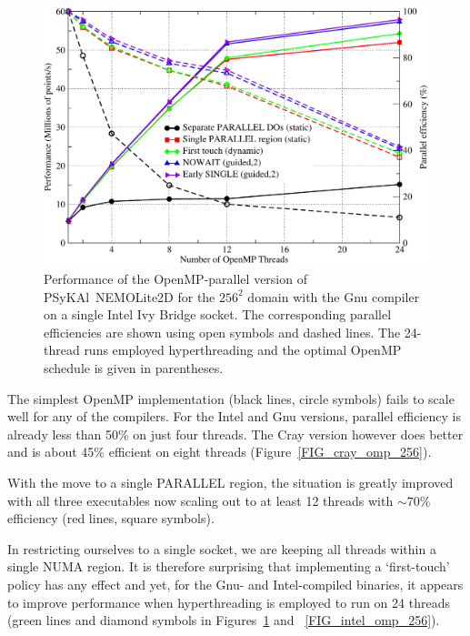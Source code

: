 \documentclass[journal]{IEEEtran}
\newlength{\picwidth}
\newcommand{\psykal}{{PS}y{KA}l}
\begin{document}
\begin{figure}
\centering
\includegraphics[width=\picwidth]{omp_scaling_256_gnu}
\caption{Performance of the OpenMP-parallel version of
  \psykal\ NEMOLite2D for the $256^2$ domain with the Gnu compiler on
  a single Intel Ivy Bridge socket. The corresponding parallel
  efficiencies are shown using open symbols and dashed lines. The
  24-thread runs employed hyperthreading and the optimal OpenMP
  schedule is given in parentheses.}
\label{FIG_gnu_omp_256}
\end{figure}

The simplest OpenMP implementation (black lines, circle symbols) fails
to scale well for any of the compilers. For the Intel and Gnu
versions, parallel efficiency is already less than 50\% on just four
threads. The Cray version however does better and is about 45\%
efficient on eight threads (Figure~\ref{FIG_cray_omp_256}).

With the move to a single PARALLEL region, the situation
is greatly improved with all three executables now scaling out to at
least 12 threads with $\sim70$\% efficiency (red lines, square symbols).

In restricting ourselves to a single socket, we are keeping all
threads within a single NUMA region. It is therefore surprising that
implementing a `first-touch' policy has any effect and yet, for the
Gnu- and Intel-compiled binaries, it appears to improve performance
when hyperthreading is employed to run on 24 threads (green lines and
diamond symbols in Figures~\ref{FIG_gnu_omp_256} and
~\ref{FIG_intel_omp_256}).
\end{document}
